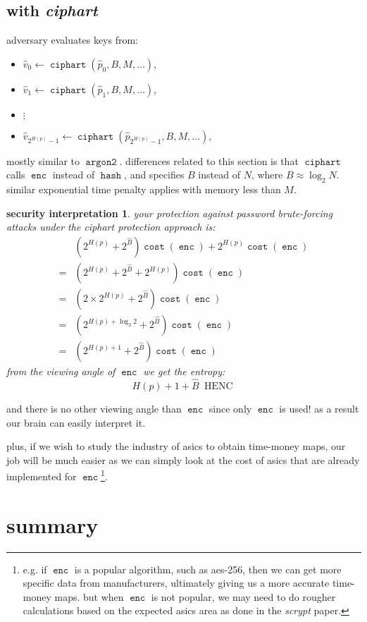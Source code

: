 \documentclass[twocolumn]{article}
\newtheorem{security}{security interpretation}
\DeclareMathOperator{\enc}{\mathtt{enc}}
\DeclareMathOperator{\hash}{\mathtt{hash}}
\DeclareMathOperator{\argon}{\mathtt{argon2}}
\DeclareMathOperator{\ciphart}{\mathtt{ciphart}}
\DeclareMathOperator{\cost}{\mathtt{cost}}
\DeclareMathOperator{\henc}{\; HENC}
\begin{document}
\subsection{with \emph{ciphart}}
adversary evaluates keys from:
\begin{itemize}
    \item $\hat v_0 \gets \ciphart(\hat p_0, B, M, \ldots)$,
    \item $\hat v_1 \gets \ciphart(\hat p_1, B, M, \ldots)$,
    \item $\vdots$
    \item $\hat v_{2^{H(p)}-1} \gets \ciphart(\hat p_{2^{H(p)}-1}, B, M,
    \ldots)$,
\end{itemize}

mostly similar to $\argon$.  differences related to this section is that
$\ciphart$ calls $\enc$ instead of $\hash$, and specifies $B$ instead of
$N$, where $B \approx \log_2 N$.  similar exponential time penalty applies
with memory less than $M$.

\begin{security}
your protection against password brute-forcing attacks under the
\emph{ciphart} protection approach is:
\begin{align*}
        & \left(2^{H(p)} + 2^{\hat B}\right) \cost(\enc) + 2^{H(p)}
            \cost(\enc) \\
    ={} & \left(2^{H(p)} + 2^{\hat B} + 2^{H(p)}\right) \cost(\enc) \\
    ={} & \left(2\times2^{H(p)} + 2^{\hat B}\right) \cost(\enc) \\
    ={} & \left(2^{H(p) + \log_2 2} + 2^{\hat B}\right) \cost(\enc) \\
    ={} & \left(2^{H(p) + 1} + 2^{\hat B}\right) \cost(\enc)
\end{align*}
from the viewing angle of $\enc$ we get the entropy:
\[
    H(p) + 1 + \hat B \henc
\]
\end{security}

and there is no other viewing angle than $\enc$ since only $\enc$ is used!
as a result our brain can easily interpret it.  

plus, if we wish to study the industry of asics to obtain time-money maps,
our job will be much easier as we can simply look at the cost of asics that
are already implemented for $\enc$\footnote{e.g. if $\enc$ is a popular
algorithm, such as aes-256, then we can get more specific data from
manufacturers, ultimately giving us a more accurate time-money maps.  but
when $\enc$ is not popular, we may need to do rougher calculations based on
the expected asics area as done in the \emph{scrypt} paper.}.

\section{summary}
\end{document}
